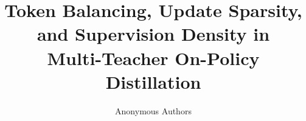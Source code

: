 \documentclass{article} %
\title{Token Balancing, Update Sparsity,\\and Supervision Density in\\Multi-Teacher On-Policy Distillation}
\author{Anonymous Authors}
\theoremstyle{remark}
\begin{document}
\maketitle














\appendix

\setcounter{table}{0}
\renewcommand{\thetable}{A\arabic{table}}




\end{document}
